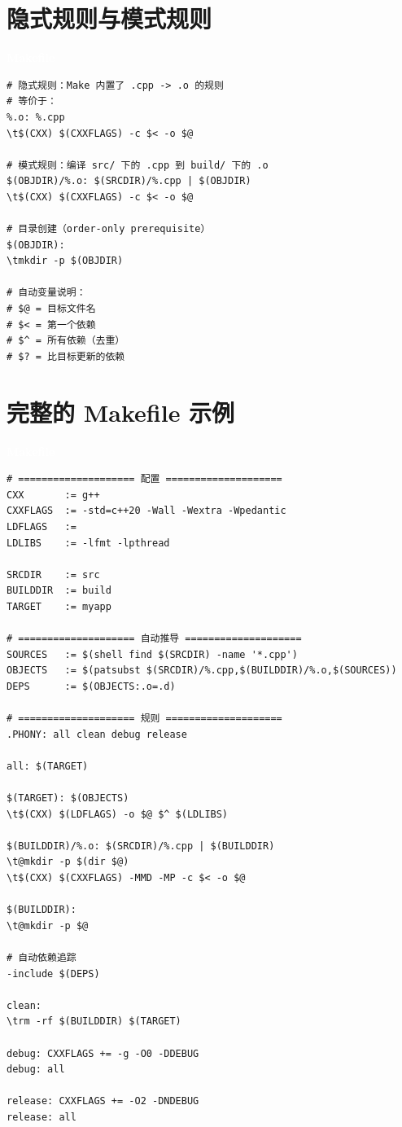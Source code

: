 \documentclass[12pt,a4paper,fontset=fandol]{ctexbook}
\newcommand{\makelabelcmd}{%
  \noindent\begin{tcolorbox}[sharp corners,colback=makeheadbg,colframe=makeheadbg,
    left=6pt,right=6pt,top=2pt,bottom=2pt,boxrule=0pt]
  \textcolor{white}{\small\bfseries\sffamily Makefile}\end{tcolorbox}%
}
\begin{document}
\section{隐式规则与模式规则}

\makelabelcmd
\begin{lstlisting}[style=bashstyle]
# 隐式规则：Make 内置了 .cpp -> .o 的规则
# 等价于：
%.o: %.cpp
\t$(CXX) $(CXXFLAGS) -c $< -o $@

# 模式规则：编译 src/ 下的 .cpp 到 build/ 下的 .o
$(OBJDIR)/%.o: $(SRCDIR)/%.cpp | $(OBJDIR)
\t$(CXX) $(CXXFLAGS) -c $< -o $@

# 目录创建（order-only prerequisite）
$(OBJDIR):
\tmkdir -p $(OBJDIR)

# 自动变量说明：
# $@ = 目标文件名
# $< = 第一个依赖
# $^ = 所有依赖（去重）
# $? = 比目标更新的依赖
\end{lstlisting}

\section{完整的 Makefile 示例}

\makelabelcmd
\begin{lstlisting}[style=bashstyle]
# ==================== 配置 ====================
CXX       := g++
CXXFLAGS  := -std=c++20 -Wall -Wextra -Wpedantic
LDFLAGS   :=
LDLIBS    := -lfmt -lpthread

SRCDIR    := src
BUILDDIR  := build
TARGET    := myapp

# ==================== 自动推导 ====================
SOURCES   := $(shell find $(SRCDIR) -name '*.cpp')
OBJECTS   := $(patsubst $(SRCDIR)/%.cpp,$(BUILDDIR)/%.o,$(SOURCES))
DEPS      := $(OBJECTS:.o=.d)

# ==================== 规则 ====================
.PHONY: all clean debug release

all: $(TARGET)

$(TARGET): $(OBJECTS)
\t$(CXX) $(LDFLAGS) -o $@ $^ $(LDLIBS)

$(BUILDDIR)/%.o: $(SRCDIR)/%.cpp | $(BUILDDIR)
\t@mkdir -p $(dir $@)
\t$(CXX) $(CXXFLAGS) -MMD -MP -c $< -o $@

$(BUILDDIR):
\t@mkdir -p $@

# 自动依赖追踪
-include $(DEPS)

clean:
\trm -rf $(BUILDDIR) $(TARGET)

debug: CXXFLAGS += -g -O0 -DDEBUG
debug: all

release: CXXFLAGS += -O2 -DNDEBUG
release: all
\end{lstlisting}
\end{document}
